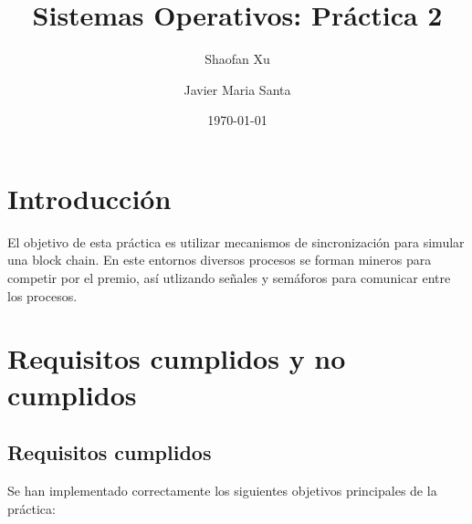 \documentclass[11pt,a4paper]{article}
\title{\textbf{Sistemas Operativos: Práctica 2}}
\author{
    Shaofan Xu \\
    \and 
    Javier Maria Santa
    }
\date{\today}
\begin{document}
\maketitle

\clearpage
\section{Introducción}
El objetivo de esta práctica es utilizar mecanismos de sincronización para simular una block chain. En este entornos diversos procesos se forman mineros
para competir por el premio, así utlizando señales y semáforos para comunicar entre los procesos.
\section{Requisitos cumplidos y no cumplidos}
\subsection{Requisitos cumplidos}
Se han implementado correctamente los siguientes objetivos principales de la práctica:
\end{document}
